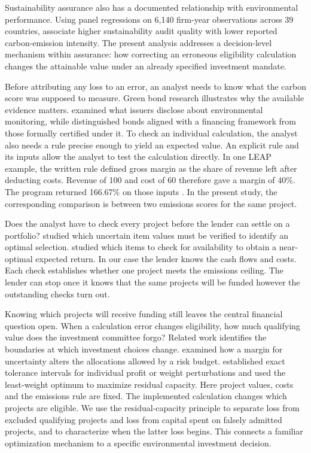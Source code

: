 Sustainability assurance also has a documented relationship with environmental performance. Using panel regressions on 6,140 firm-year observations across 39 countries, \citet{ibrahim2026} associate higher sustainability audit quality with lower reported carbon-emission intensity. The present analysis addresses a decision-level mechanism within assurance: how correcting an erroneous eligibility calculation changes the attainable value under an already specified investment mandate.

Before attributing any loss to an error, an analyst needs to know what the carbon score was supposed to measure. Green bond research illustrates why the available evidence matters. \citet{nicolici} examined what issuers disclose about environmental monitoring, while \citet{loiola} distinguished bonds aligned with a financing framework from those formally certified under it. To check an individual calculation, the analyst also needs a rule precise enough to yield an expected value. An explicit rule and its inputs allow the analyst to test the calculation directly. In one LEAP example, the written rule defined gross margin as the share of revenue left after deducting costs. Revenue of 100 and cost of 60 therefore gave a margin of 40\%. The program returned 166.67\% on those inputs \citep{review}. In the present study, the corresponding comparison is between two emissions scores for the same project.

Does the analyst have to check every project before the lender can settle on a portfolio? \citet{schloter} studied which uncertain item values must be verified to identify an optimal selection. \citet{dughmi} studied which items to check for availability to obtain a near-optimal expected return. In our case the lender knows the cash flows and costs. Each check establishes whether one project meets the emissions ceiling. The lender can stop once it knows that the same projects will be funded however the outstanding checks turn out.

Knowing which projects will receive funding still leaves the central financial question open. When a calculation error changes eligibility, how much qualifying value does the investment committee forgo? Related work identifies the boundaries at which investment choices change. \citet{hien} examined how a margin for uncertainty alters the allocations allowed by a risk budget. \citet{pisinger} established exact tolerance intervals for individual profit or weight perturbations and used the least-weight optimum to maximize residual capacity. Here project values, costs and the emissions rule are fixed. The implemented calculation changes which projects are eligible. We use the residual-capacity principle to separate loss from excluded qualifying projects and loss from capital spent on falsely admitted projects, and to characterize when the latter loss begins. This connects a familiar optimization mechanism to a specific environmental investment decision.

